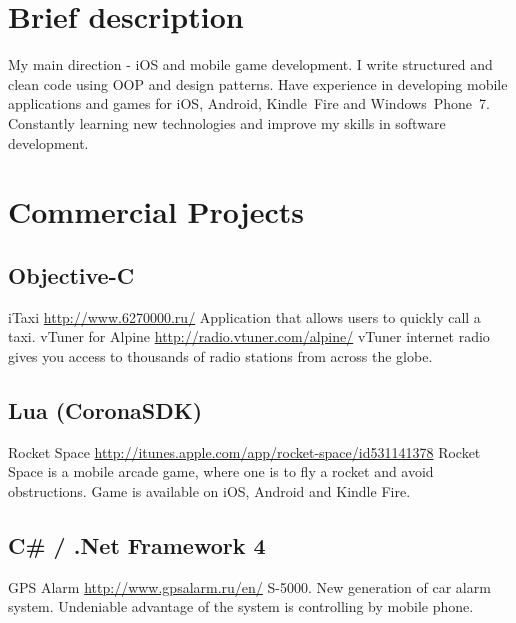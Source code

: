 \documentclass[11pt,a4paper]{moderncv}
\begin{document}
\maketitle

\section{Brief description}
\cvline
  {}
  {My main direction - iOS and mobile game development.\newline{}
  I write structured and clean code using OOP and design patterns. Have experience in developing mobile applications and games for iOS, Android, Kindle~Fire and Windows~Phone~7. Constantly learning new technologies and improve my skills in software development.{}}

\section{Commercial Projects}
  \subsection{Objective-C}
  \cvline
    {iTaxi}
    {\url{http://www.6270000.ru/}\newline{}
    Application that allows users to quickly call a taxi.}
  \cvline
    {vTuner for Alpine}
    {\url{http://radio.vtuner.com/alpine/}\newline{}
    vTuner internet radio gives you access to thousands of radio stations from across the globe.}
    
  \subsection{Lua (CoronaSDK)}
  \cvline
    {Rocket Space}
    {\url{http://itunes.apple.com/app/rocket-space/id531141378}\newline{}
    Rocket Space is a mobile arcade game, where one is to fly a rocket and avoid obstructions.\newline
    Game is available on iOS, Android and Kindle Fire.}
    
  \subsection{C\# / .Net Framework 4}
  \cvline
    {GPS Alarm}
    {\url{http://www.gpsalarm.ru/en/}\newline{}
    S-5000. New generation of car alarm system.\newline
    Undeniable advantage of the system is controlling by mobile phone.}
\end{document}
